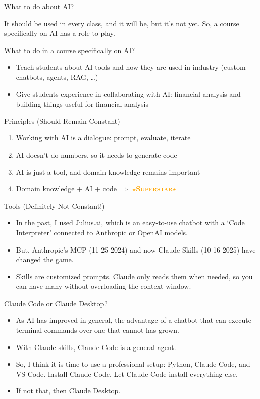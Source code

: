\documentclass[aspectratio=169]{beamer}
\begin{document}
\begin{frame}{What to do about AI?}

It should be used in every class, and it will be, but it's not yet.  So, a course specifically on AI has a role to play.


\vspace{1em}

What to do in a course specifically on AI?
\begin{itemize}
\item Teach students about AI tools and how they are used in industry (custom chatbots, agents, RAG, \ldots)
\item Give students experience in collaborating with AI: financial analysis and building things useful for financial analysis
\end{itemize}  
\end{frame}


\begin{frame}{Principles (Should Remain Constant)}
\begin{enumerate}
\item Working with AI is a dialogue: prompt, evaluate, iterate
\item AI doesn't do numbers, so it needs to generate code
\item AI is just a tool, and domain knowledge remains important 
\pause
\item Domain knowledge + AI + code $\Rightarrow$ \textcolor{orange}{$\star$\textbf{\textsc{Superstar}}$\star$}
\end{enumerate}
\end{frame}

\begin{frame}{Tools (Definitely Not Constant!)}
\begin{itemize}
\item In the past, I used Julius.ai, which is an easy-to-use chatbot with a `Code Interpreter' connected to Anthropic or OpenAI models.
\item But, Anthropic's MCP (11-25-2024) and now Claude Skills (10-16-2025) have changed the game.
\item Skills are customized prompts.  Claude only reads them when needed, so you can have many without overloading the context window. 
\end{itemize}
\end{frame}

\begin{frame}{Claude Code or Claude Desktop?}
\begin{itemize}
\item As AI has improved in general, the advantage of a chatbot that can execute terminal commands over one that cannot has grown.
\item With Claude skills, Claude Code is a general agent.
\item So, I think it is time to use a professional setup: Python, Claude Code, and VS Code.  Install Claude Code.  Let Claude Code install everything else.
\item If not that, then Claude Desktop.
\end{itemize}
\end{frame}
\end{document}
